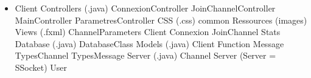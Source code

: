 \documentclass[11pt]{article}
\begin{document}
\begin{itemize}
    \item Client
        \subitem Controllers (.java)
            \subsubitem ConnexionController
            \subsubitem JoinChannelController
            \subsubitem MainController
            \subsubitem ParametresController
        \subitem CSS (.css)
            \subsubitem common
        \subitem Ressources
            \subsubitem (images)
        \subitem Views (.fxml)
            \subsubitem ChannelParameters
            \subsubitem Client
            \subsubitem Connexion
            \subsubitem JoinChannel
            \subsubitem Stats
        \subitem Database (.java)
            \subsubitem DatabaseClass
        \subitem Models (.java)
            \subsubitem Client
            \subsubitem Function
            \subsubitem Message
            \subsubitem TypesChannel
            \subsubitem TypesMessage
        \subitem Server (.java)
            \subsubitem Channel
            \subsubitem Server (Server = SSocket)
            \subsubitem User
\end{itemize}
\end{document}
